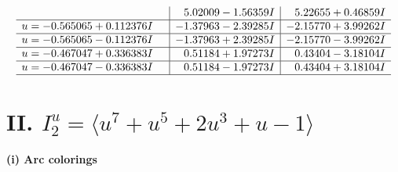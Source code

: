 \documentclass[1p]{elsarticle_modified}
\theoremstyle{definition}
\begin{document}
$$\begin{array}{c|c|c}
 & \phantom{-}5.02009 - 1.56359 I & \phantom{-}5.22655 + 0.46859 I \\ \hline\begin{aligned}
u &= -0.565065 + 0.112376 I\end{aligned}
 & -1.37963 - 2.39285 I & -2.15770 + 3.99262 I \\ \hline\begin{aligned}
u &= -0.565065 - 0.112376 I\end{aligned}
 & -1.37963 + 2.39285 I & -2.15770 - 3.99262 I \\ \hline\begin{aligned}
u &= -0.467047 + 0.336383 I\end{aligned}
 & \phantom{-}0.51184 + 1.97273 I & \phantom{-}0.43404 - 3.18104 I \\ \hline\begin{aligned}
u &= -0.467047 - 0.336383 I\end{aligned}
 & \phantom{-}0.51184 - 1.97273 I & \phantom{-}0.43404 + 3.18104 I\\
 \hline 
 \end{array}$$\newpage\newpage\renewcommand{\arraystretch}{1}
\centering \section*{II. $I^u_{2}= \langle u^7+u^5+2 u^3+u-1 \rangle$}
\flushleft \textbf{(i) Arc colorings}\\
\end{document}
